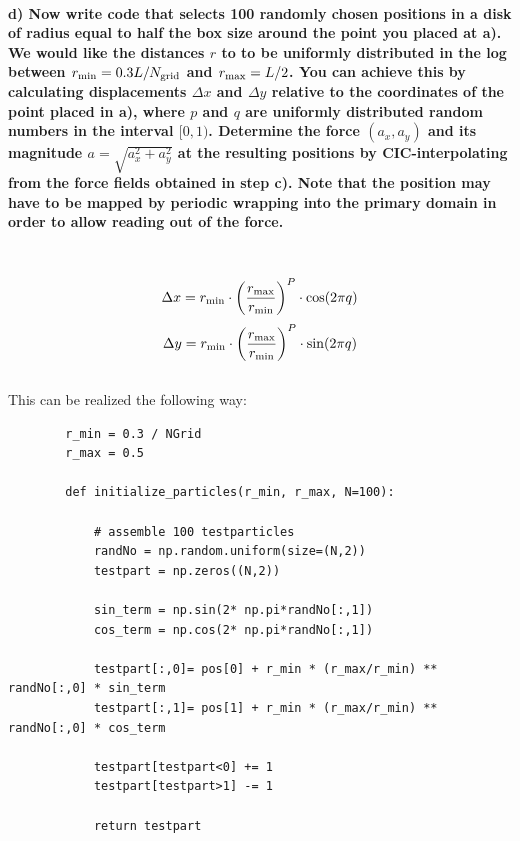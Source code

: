 \newpage
\paragraph{d) Now write code that selects 100 randomly chosen positions in a 
    disk of radius equal to half the box size around the point you placed at 
    a). We would like the distances $r$ to to be uniformly distributed in the 
    log between $r_\textnormal{min}=0.3L/N_\textnormal{grid}$ and 
    $r_\textnormal{max}=L/2$. You can achieve this by calculating 
    displacements $\Delta x$ and $\Delta y$ relative to the coordinates of the 
    point placed in a), where $p$ and $q$ are uniformly distributed random 
    numbers in the interval $[0,1)$. Determine the force $(a_x,a_y)$ and its 
    magnitude $a=\sqrt{a_x^2+a_y^2}$ at the resulting positions by 
    CIC-interpolating from the force fields obtained in step c). Note that 
    the position may have to be mapped by periodic wrapping into the primary 
    domain in order to allow reading out of the force.
} \ \\
    \begin{equation}
        \Delta x=
        r_\textnormal{min}\cdot\bigg(
            \frac{r_\textnormal{max}}{r_\textnormal{min}}
        \bigg)^P\cdot\cos(2\pi q)
    \end{equation}
    \begin{equation}
        \Delta y=
        r_\textnormal{min}\cdot\bigg(
            \frac{r_\textnormal{max}}{r_\textnormal{min}}
        \bigg)^P\cdot\sin(2\pi q)
    \end{equation} \ \\
    This can be realized the following way: 
    \begin{lstlisting}
        r_min = 0.3 / NGrid
        r_max = 0.5

        def initialize_particles(r_min, r_max, N=100):

            # assemble 100 testparticles
            randNo = np.random.uniform(size=(N,2))
            testpart = np.zeros((N,2))

            sin_term = np.sin(2* np.pi*randNo[:,1])
            cos_term = np.cos(2* np.pi*randNo[:,1])

            testpart[:,0]= pos[0] + r_min * (r_max/r_min) ** randNo[:,0] * sin_term
            testpart[:,1]= pos[1] + r_min * (r_max/r_min) ** randNo[:,0] * cos_term

            testpart[testpart<0] += 1
            testpart[testpart>1] -= 1

            return testpart\end{lstlisting}

